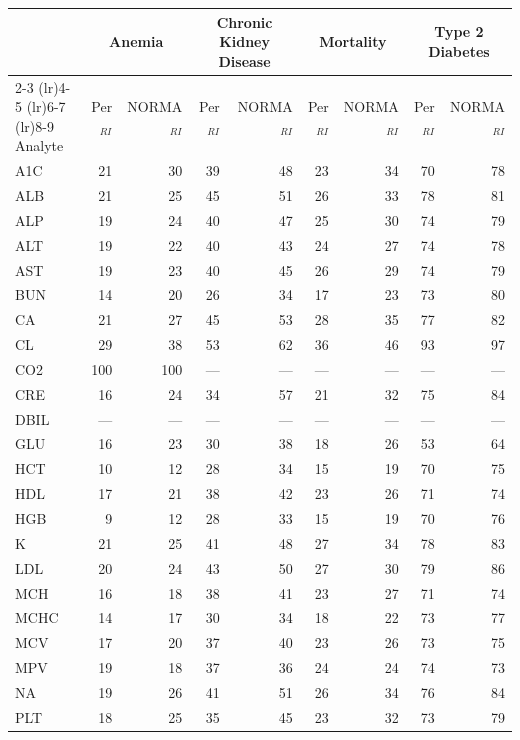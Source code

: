 \begin{table}[ht]
\centering
\footnotesize
\begin{tabular}{lrrrrrrrr}
\toprule
 & \multicolumn{2}{c}{Anemia} & \multicolumn{2}{c}{Chronic Kidney Disease} & \multicolumn{2}{c}{Mortality} & \multicolumn{2}{c}{Type 2 Diabetes} \\
\cmidrule(lr){2-3} \cmidrule(lr){4-5} \cmidrule(lr){6-7} \cmidrule(lr){8-9}
Analyte & Per$_{RI}$ & NORMA$_{RI}$ & Per$_{RI}$ & NORMA$_{RI}$ & Per$_{RI}$ & NORMA$_{RI}$ & Per$_{RI}$ & NORMA$_{RI}$ \\
\midrule
A1C & 21 & 30 & 39 & 48 & 23 & 34 & 70 & 78 \\
ALB & 21 & 25 & 45 & 51 & 26 & 33 & 78 & 81 \\
ALP & 19 & 24 & 40 & 47 & 25 & 30 & 74 & 79 \\
ALT & 19 & 22 & 40 & 43 & 24 & 27 & 74 & 78 \\
AST & 19 & 23 & 40 & 45 & 26 & 29 & 74 & 79 \\
BUN & 14 & 20 & 26 & 34 & 17 & 23 & 73 & 80 \\
CA & 21 & 27 & 45 & 53 & 28 & 35 & 77 & 82 \\
CL & 29 & 38 & 53 & 62 & 36 & 46 & 93 & 97 \\
CO2 & 100 & 100 & --- & --- & --- & --- & --- & --- \\
CRE & 16 & 24 & 34 & 57 & 21 & 32 & 75 & 84 \\
DBIL & --- & --- & --- & --- & --- & --- & --- & --- \\
GLU & 16 & 23 & 30 & 38 & 18 & 26 & 53 & 64 \\
HCT & 10 & 12 & 28 & 34 & 15 & 19 & 70 & 75 \\
HDL & 17 & 21 & 38 & 42 & 23 & 26 & 71 & 74 \\
HGB & 9 & 12 & 28 & 33 & 15 & 19 & 70 & 76 \\
K & 21 & 25 & 41 & 48 & 27 & 34 & 78 & 83 \\
LDL & 20 & 24 & 43 & 50 & 27 & 30 & 79 & 86 \\
MCH & 16 & 18 & 38 & 41 & 23 & 27 & 71 & 74 \\
MCHC & 14 & 17 & 30 & 34 & 18 & 22 & 73 & 77 \\
MCV & 17 & 20 & 37 & 40 & 23 & 26 & 73 & 75 \\
MPV & 19 & 18 & 37 & 36 & 24 & 24 & 74 & 73 \\
NA & 19 & 26 & 41 & 51 & 26 & 34 & 76 & 84 \\
PLT & 18 & 25 & 35 & 45 & 23 & 32 & 73 & 79 \\

\end{tabular}
\end{table}
